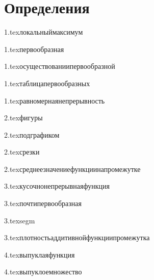 

\usepackage{sectsty}

\allsectionsfont{\raggedright}
\subsectionfont{\fontsize{14}{15}\selectfont}

\cfoot{}
\rfoot{}




\section{Определения}

{1.tex}{локальныймаксимум}

{1.tex}{первообразная}

{1.tex}{осуществованиипервообразной}

{1.tex}{таблицапервообразных}

{1.tex}{равномернаянепрерывность}

{2.tex}{фигуры}

{2.tex}{подграфиком}

{2.tex}{срезки}

{2.tex}{среднеезначениефункциинапромежутке}

{3.tex}{кусочнонепрерывнаяфункция}

{3.tex}{почтипервообразная}

{3.tex}{segm}

{3.tex}{плотностьаддитивнойфункциипромежутка}

{4.tex}{выпуклаяфункция}

{4.tex}{выпуклоемножество}

